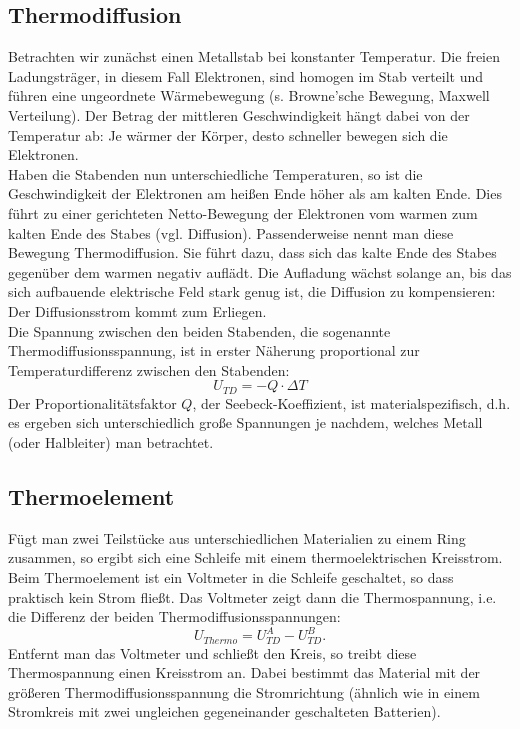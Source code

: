 \subsection{Thermodiffusion}

Betrachten wir zunächst einen Metallstab bei konstanter Temperatur. Die freien Ladungsträger, in diesem Fall Elektronen, sind homogen im Stab verteilt und führen eine ungeordnete Wärmebewegung (s. Browne'sche Bewegung, Maxwell Verteilung). Der Betrag der mittleren Geschwindigkeit hängt dabei von der Temperatur ab: Je wärmer der Körper, desto schneller bewegen sich die Elektronen.\\
Haben die Stabenden nun unterschiedliche Temperaturen, so ist die Geschwindigkeit der Elektronen am heißen Ende höher als am kalten Ende. Dies führt zu einer gerichteten Netto-Bewegung der Elektronen vom warmen zum kalten Ende des Stabes (vgl. Diffusion). Passenderweise nennt man diese Bewegung Thermodiffusion. Sie führt dazu, dass sich das kalte Ende des Stabes gegenüber dem warmen negativ auflädt. Die Aufladung wächst solange an, bis das sich aufbauende elektrische Feld stark genug ist, die Diffusion zu kompensieren: Der Diffusionsstrom kommt zum Erliegen.\\
Die Spannung zwischen den beiden Stabenden, die sogenannte Thermodiffusionsspannung, ist in erster Näherung proportional zur Temperaturdifferenz zwischen den Stabenden:
\begin{equation}
	U_{TD} = -Q\cdot \Delta T
\end{equation}
Der Proportionalitätsfaktor $Q$, der Seebeck-Koeffizient, ist materialspezifisch, d.h. es ergeben sich unterschiedlich große Spannungen je nachdem, welches Metall (oder Halbleiter) man betrachtet.

\subsection{Thermoelement}

Fügt man zwei Teilstücke aus unterschiedlichen Materialien zu einem Ring zusammen, so ergibt sich eine Schleife mit einem thermoelektrischen Kreisstrom. Beim Thermoelement ist ein Voltmeter in die Schleife geschaltet, so dass praktisch kein Strom fließt. Das Voltmeter zeigt dann die Thermospannung, i.e. die Differenz der beiden Thermodiffusionsspannungen:
\begin{equation}
	U_{Thermo} = U^A_{TD} - U^B_{TD}.
\end{equation}
Entfernt man das Voltmeter und schließt den Kreis, so treibt diese Thermospannung einen Kreisstrom an. Dabei bestimmt das Material mit der größeren Thermodiffusionsspannung die Stromrichtung (ähnlich wie in einem Stromkreis mit zwei ungleichen gegeneinander geschalteten Batterien).


